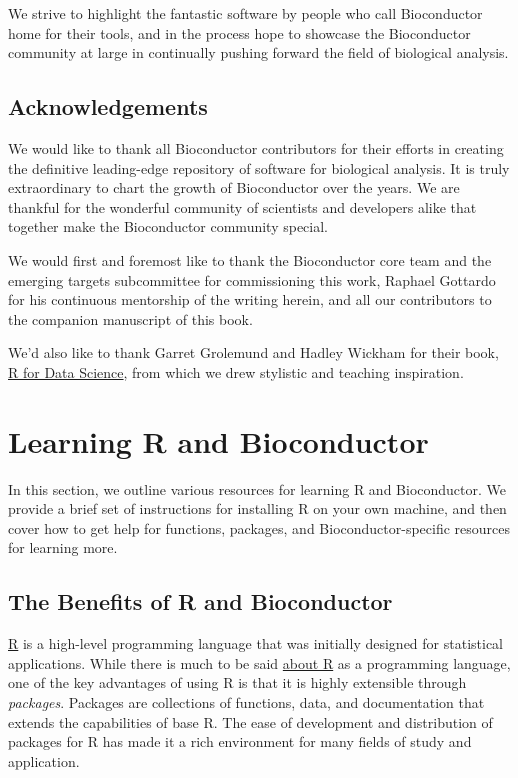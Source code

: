 \documentclass[]{book}
\begin{document}
We strive to highlight the fantastic software by people who call Bioconductor home for their tools, and in the process hope to showcase the Bioconductor community at large in continually pushing forward the field of biological analysis.

\hypertarget{acknowledgements}{%
\section{Acknowledgements}\label{acknowledgements}}

We would like to thank all Bioconductor contributors for their efforts in creating the definitive leading-edge repository of software for biological analysis. It is truly extraordinary to chart the growth of Bioconductor over the years. We are thankful for the wonderful community of scientists and developers alike that together make the Bioconductor community special.

We would first and foremost like to thank the Bioconductor core team and the emerging targets subcommittee for commissioning this work, Raphael Gottardo for his continuous mentorship of the writing herein, and all our contributors to the companion manuscript of this book.

We'd also like to thank Garret Grolemund and Hadley Wickham for their book, \href{https://r4ds.had.co.nz/index.html}{R for Data Science}, from which we drew stylistic and teaching inspiration.

\hypertarget{learning-r-and-more}{%
\chapter{Learning R and Bioconductor}\label{learning-r-and-more}}

In this section, we outline various resources for learning R and Bioconductor. We provide a brief set of instructions for installing R on your own machine, and then cover how to get help for functions, packages, and Bioconductor-specific resources for learning more.

\hypertarget{the-benefits-of-r-and-bioconductor}{%
\section{The Benefits of R and Bioconductor}\label{the-benefits-of-r-and-bioconductor}}

\href{http://www.r-project.org/}{R} is a high-level programming language that was initially designed for statistical applications. While there is much to be said \href{https://www.r-project.org/about.html}{about R} as a programming language, one of the key advantages of using R is that it is highly extensible through \emph{packages}. Packages are collections of functions, data, and documentation that extends the capabilities of base R. The ease of development and distribution of packages for R has made it a rich environment for many fields of study and application.
\end{document}
